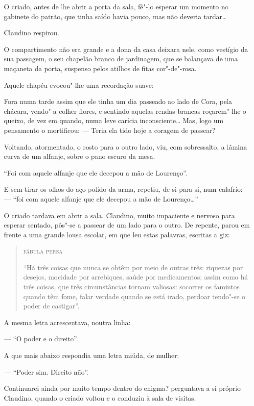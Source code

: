 O criado, antes de lhe abrir a porta da sala, fê"-lo esperar um momento
no gabinete do patrão, que tinha saído havia pouco, mas não deveria
tardar\ldots{}

Claudino respirou.

O compartimento não era grande e a dona da casa deixara nele, como
vestígio da sua passagem, o seu chapelão branco de jardinagem, que se
balançava de uma maçaneta da porta, suspenso pelos atilhos de fitas
cor"-de"-rosa.

Aquele chapéu evocou"-lhe uma recordação suave:

Fora numa tarde assim que ele tinha um dia passeado ao lado de Cora,
pela chácara, vendo"-a colher flores, e sentindo aquelas rendas brancas
roçarem"-lhe o queixo, de vez em quando, numa leve carícia
inconsciente\ldots{} Mas, logo um pensamento o mortificou: --- Teria ela tido
hoje a coragem de passear?

Voltando, atormentado, o rosto para o outro lado, viu, com sobressalto,
a lâmina curva de um alfanje, sobre o pano escuro da mesa.

``Foi com aquele alfanje que ele decepou a mão de Lourenço''.

E sem tirar os olhos do aço polido da arma, repetiu, de si para si, num
calafrio: --- ``foi com aquele alfanje que ele decepou a mão de
Lourenço\ldots{}''

O criado tardava em abrir a sala. Claudino, muito impaciente e nervoso
para esperar sentado, pôs"-se a passear de um lado para o outro. De
repente, parou em frente a uma grande lousa escolar, em que leu estas
palavras, escritas a giz:

\begin{quote}
\textsc{fábula persa}

``Há três coisas que nunca se obtêm por meio de outras três: riquezas
por desejos, mocidade por arrebiques, saúde por medicamentos; assim como
há três coisas, que três circunstâncias tornam valiosas: socorrer os
famintos quando têm fome, falar verdade quando se está irado, perdoar
tendo"-se o poder de castigar''.
\end{quote}

A mesma letra acrescentava, noutra linha:

--- ``O poder e o direito''.

A que mais abaixo respondia uma letra miúda, de mulher:

--- ``Poder sim. Direito não''.

Continuarei ainda por muito tempo dentro do enigma? perguntava a si
próprio Claudino, quando o criado voltou e o conduziu à sala de visitas.

